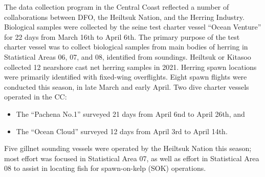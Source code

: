The data collection program in the Central Coast reflected a number of
collaborations between DFO, the Heiltsuk Nation, and the Herring Industry.
Biological samples were collected by the seine test charter vessel ``Ocean Venture''
for 22 days from March 16th to April 6th.
The primary purpose of the test charter vessel was to collect biological samples
from main bodies of herring in Statistical Areas 06, 07, and 08, identified from soundings.
Heiltsuk or Kitasoo collected 12 nearshore cast net herring samples in 2021.
Herring spawn locations were primarily identified with fixed-wing overflights.
Eight spawn flights were conducted this season, in late March and early April.
Two dive charter vessels operated in the CC:
\begin{itemize}
\item The ``Pachena No.1'' surveyed 21 days from April 6nd to April 26th, and
\item The ``Ocean Cloud'' surveyed 12 days from April 3rd to April 14th.
\end{itemize}
Five gillnet sounding vessels were operated by the Heiltsuk Nation this season;
most effort was focused in Statistical Area 07, as well as
effort in Statistical Area 08 to assist in locating fish
for spawn-on-kelp (SOK) operations.
